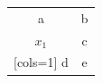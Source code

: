 \documentclass{article}
\begin{document}
\begin{NiceTabular}{cc}
a & b \\
$x_1$ & c \\
[cols=1]
d & e \\
\end{NiceTabular}
\end{document}
